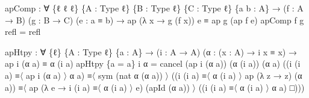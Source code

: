 \documentclass[
  11pt,
  oneside,
  article]{memoir}
\newenvironment{Shaded}{}{}
\newcommand{\NormalTok}[1]{#1}
\newcommand{\OtherTok}[1]{\textcolor[rgb]{0.00,0.44,0.13}{#1}}
\theoremstyle{definition}
\theoremstyle{plain}
\newcommand{\0}{\textsf{0}}
\newcommand{\1}{\tn{\textsf{1}}}
\begin{document}
\begin{Shaded}
\begin{Highlighting}[]
\NormalTok{apComp }\OtherTok{:} \OtherTok{∀} \OtherTok{\{}\NormalTok{ℓ ℓ\textquotesingle{} ℓ\textquotesingle{}\textquotesingle{}}\OtherTok{\}} \OtherTok{\{}\NormalTok{A }\OtherTok{:}\NormalTok{ Type ℓ}\OtherTok{\}} \OtherTok{\{}\NormalTok{B }\OtherTok{:}\NormalTok{ Type ℓ\textquotesingle{}}\OtherTok{\}} \OtherTok{\{}\NormalTok{C }\OtherTok{:}\NormalTok{ Type ℓ\textquotesingle{}\textquotesingle{}}\OtherTok{\}} \OtherTok{\{}\NormalTok{a b }\OtherTok{:}\NormalTok{ A}\OtherTok{\}}
         \OtherTok{→} \OtherTok{(}\NormalTok{f }\OtherTok{:}\NormalTok{ A }\OtherTok{→}\NormalTok{ B}\OtherTok{)} \OtherTok{(}\NormalTok{g }\OtherTok{:}\NormalTok{ B }\OtherTok{→}\NormalTok{ C}\OtherTok{)} \OtherTok{(}\NormalTok{e }\OtherTok{:}\NormalTok{ a ≡ b}\OtherTok{)}
         \OtherTok{→}\NormalTok{ ap }\OtherTok{(λ}\NormalTok{ x }\OtherTok{→}\NormalTok{ g }\OtherTok{(}\NormalTok{f x}\OtherTok{))}\NormalTok{ e ≡ ap g }\OtherTok{(}\NormalTok{ap f e}\OtherTok{)}
\NormalTok{apComp f g refl }\OtherTok{=}\NormalTok{ refl}

\NormalTok{apHtpy }\OtherTok{:} \OtherTok{∀} \OtherTok{\{}\NormalTok{ℓ}\OtherTok{\}} \OtherTok{\{}\NormalTok{A }\OtherTok{:}\NormalTok{ Type ℓ}\OtherTok{\}} \OtherTok{\{}\NormalTok{a }\OtherTok{:}\NormalTok{ A}\OtherTok{\}}
         \OtherTok{→} \OtherTok{(}\NormalTok{i }\OtherTok{:}\NormalTok{ A }\OtherTok{→}\NormalTok{ A}\OtherTok{)} \OtherTok{(}\NormalTok{α }\OtherTok{:} \OtherTok{(}\NormalTok{x }\OtherTok{:}\NormalTok{ A}\OtherTok{)} \OtherTok{→}\NormalTok{ i x ≡ x}\OtherTok{)}
         \OtherTok{→}\NormalTok{ ap i }\OtherTok{(}\NormalTok{α a}\OtherTok{)}\NormalTok{ ≡ α }\OtherTok{(}\NormalTok{i a}\OtherTok{)}
\NormalTok{apHtpy }\OtherTok{\{}\NormalTok{a }\OtherTok{=}\NormalTok{ a}\OtherTok{\}}\NormalTok{ i α }\OtherTok{=} 
\NormalTok{    cancel }\OtherTok{(}\NormalTok{ap i }\OtherTok{(}\NormalTok{α a}\OtherTok{))} \OtherTok{(}\NormalTok{α }\OtherTok{(}\NormalTok{i a}\OtherTok{))} \OtherTok{(}\NormalTok{α a}\OtherTok{)} 
           \OtherTok{((}\NormalTok{i }\OtherTok{(}\NormalTok{i a}\OtherTok{)}\NormalTok{ ≡〈 ap i }\OtherTok{(}\NormalTok{α a}\OtherTok{)}\NormalTok{ 〉 α a}\OtherTok{)} 
\NormalTok{           ≡〈 sym }\OtherTok{(}\NormalTok{nat α }\OtherTok{(}\NormalTok{α a}\OtherTok{))}\NormalTok{ 〉 }
           \OtherTok{((}\NormalTok{i }\OtherTok{(}\NormalTok{i a}\OtherTok{)}\NormalTok{ ≡〈 α }\OtherTok{(}\NormalTok{i a}\OtherTok{)}\NormalTok{ 〉 ap }\OtherTok{(λ}\NormalTok{ z }\OtherTok{→}\NormalTok{ z}\OtherTok{)} \OtherTok{(}\NormalTok{α a}\OtherTok{))} 
\NormalTok{           ≡〈 ap }\OtherTok{(λ}\NormalTok{ e }\OtherTok{→}\NormalTok{ i }\OtherTok{(}\NormalTok{i a}\OtherTok{)}\NormalTok{ ≡〈 α }\OtherTok{(}\NormalTok{i a}\OtherTok{)}\NormalTok{ 〉 e}\OtherTok{)} \OtherTok{(}\NormalTok{apId }\OtherTok{(}\NormalTok{α a}\OtherTok{))}\NormalTok{ 〉 }
           \OtherTok{((}\NormalTok{i }\OtherTok{(}\NormalTok{i a}\OtherTok{)}\NormalTok{ ≡〈 α }\OtherTok{(}\NormalTok{i a}\OtherTok{)}\NormalTok{ 〉 α a}\OtherTok{)}\NormalTok{ □}\OtherTok{)))}


\end{Highlighting}
\end{Shaded}
\end{document}
